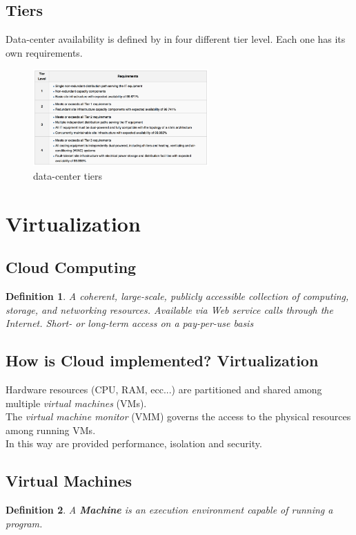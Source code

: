\documentclass[10pt, oneside]{article}
\newtheorem{defn}{Definition}
\begin{document}
\subsection{Tiers}
Data-center availability is defined by in four different tier level. Each one has its own requirements.
\begin{figure}[H]
    \begin{center}
    \includegraphics[width=0.6\textwidth]{img/img30.png}
    \caption{data-center tiers}
    \label{fig:tiers}
    \end{center}
\end{figure}

\newpage

\section{Virtualization}
\subsection{Cloud Computing}
\begin{defn}
    A coherent, large-scale, publicly accessible collection of computing, storage, and networking resources. Available via Web service calls through the Internet. Short- or long-term access on a pay-per-use basis
\end{defn}
\subsection*{How is Cloud implemented? Virtualization}
Hardware resources (CPU, RAM, ecc...) are partitioned and shared among multiple {\sl virtual machines} (VMs).\\
The {\sl virtual machine monitor} (VMM) governs the access to the physical resources among running VMs.\\
In this way are provided performance, isolation and security.
\subsection{Virtual Machines}
\begin{defn}
    A {\bf Machine} is an execution environment capable of running a program.
\end{defn}
\end{document}
